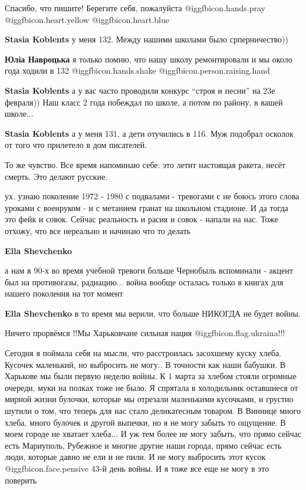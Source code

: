 \begin{itemize}
Спасибо, что пишите! Берегите себя, пожалуйста  @igg{fbicon.hands.pray}
@igg{fbicon.heart.yellow}  @igg{fbicon.heart.blue} 

\begin{itemize} %
\textbf{Stasia Koblents} у меня 132. Между нашими школами было срперничество))

\textbf{Юліа Навроцька} я только помню, что нашу школу ремонтировали и мы около года ходили в 132 @igg{fbicon.hands.shake}  @igg{fbicon.person.raising.hand} 

\textbf{Stasia Koblents} а у вас часто проводили конкурс \enquote{строя и песни} на 23е февраля))
Наш класс 2 года побеждал по школе, а потом по району, в вашей школе...

\textbf{Stasia Koblents} а у меня 131, а дети отучились в 116. Муж подобрал осколок от того что прилетело в дом писателей.
\end{itemize} %

То же чувство. Все время напоминаю себе: это летит настоящая ракета, несёт смерть. Это делают русские.


ух. узнаю поколение 1972 - 1980 с подвалами - тревогами с не боюсь этого слова
уроками с военруком - и с метанием гранат на школьном стадионе. И да тогда это
фейк и совок. Сейчас реальность и расия и совок - напали на нас. Тоже отхожу,
что все нереально и начинаю что то делать

\begin{itemize} %
\textbf{Ella Shevchenko} 

а нам в 90-х во время учебной тревоги больше Чернобыль вспоминали - акцент был
на противогазы, радиацию... война вообще осталась только в книгах для нашего
поколения на тот момент

\textbf{Ella Shevchenko} в то время мы верили, что больше НИКОГДА не будет войны.
\end{itemize} %

Ничего прорвёмся !!Мы Харьковчане сильная нация @igg{fbicon.flag.ukraina}!!!


Сегодня я поймала себя на мысли, что расстроилась засохшему куску хлеба.
Кусочек маленький, но выбросить не могу.. В точности как наши бабушки. В
Харькове мы были первую неделю войны. К 1 марта за хлебом стояли огромные
очереди, муки на полках тоже не было. Я спрятала в холодильник оставшиеся от
мирной жизни булочки, которые мы отрезали маленькими кусочками, и грустно
шутили о том, что теперь для нас стало деликатесным товаром. В Виннице много
хлеба, много булочек и другой выпечки, но я не могу забыть то ощущение. В моем
городе не хватает хлеба... И уж тем более не могу забыть, что прямо сейчас есть
Мариуполь, Рубежное и многие другие наши города, прямо сейчас есть люди,
которые давно не ели и не пили. И не могу выбросить этот кусок @igg{fbicon.face.pensive}  43-й день
войны. И я тоже все еще не могу в это поверить


\end{itemize}

